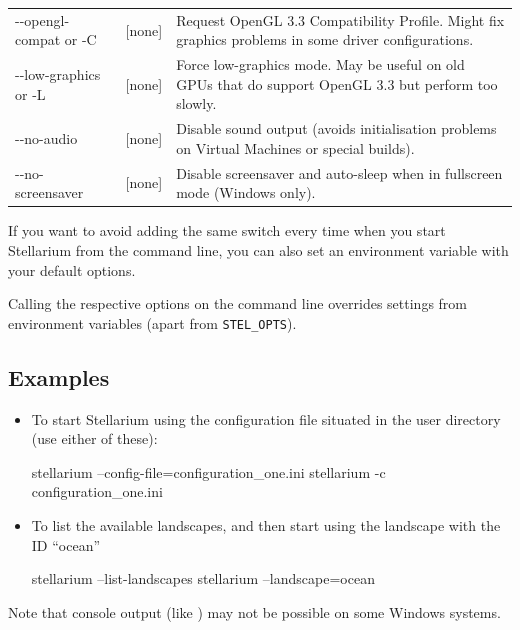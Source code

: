 \begin{longtable}{l|c|p{68mm}}
-\/-opengl-compat or -C & {[}none{]} & Request OpenGL 3.3 Compatibility Profile. Might fix graphics problems in some driver configurations.\\
-\/-low-graphics or -L & {[}none{]} & Force low-graphics mode. May be useful on old GPUs that do support OpenGL 3.3 but perform too slowly.\\\midrule
-\/-no-audio         & {[}none{]} & Disable sound output (avoids initialisation problems on Virtual Machines or special builds).\\\midrule
-\/-no-screensaver   & {[}none{]} & Disable screensaver and auto-sleep when in fullscreen mode (Windows only).\\\midrule
\bottomrule
\end{longtable}

\noindent {} If you want to avoid adding the same
switch every time when you start Stellarium from the command line, you
can also set an environment variable  with your
default options. 

Calling the respective options on the command line overrides settings from environment variables (apart from \texttt{STEL\_OPTS}).

\subsection{Examples}
\label{sec:CommandLineOptions:Examples}

\begin{itemize}
\item To start Stellarium using the configuration file
   situated in the user directory (use either of
  these):

\begin{commands}
stellarium --config-file=configuration_one.ini
stellarium -c configuration_one.ini
\end{commands}

\item To list the available landscapes, and then start using the
  landscape with the ID ``ocean''
\begin{commands}
stellarium --list-landscapes 
stellarium --landscape=ocean
\end{commands}
\end{itemize}

\noindent Note that console output (like ) may not be possible on some Windows systems. 

